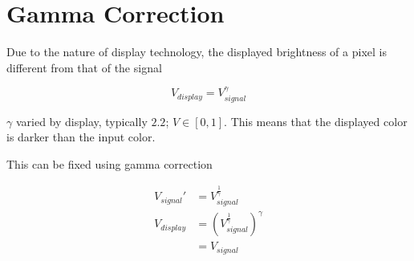 \chapter{Gamma Correction}

  Due to the nature of display technology, the displayed brightness of a pixel
  is different from that of the signal

  \begin{equation}
    V_{display} = V_{signal}^{\gamma}
  \end{equation}

  $ \gamma $ varied by display, typically $ 2.2 $;
  $ V \in \left[ 0, 1 \right] $.  This means that the displayed
  color is darker than the input color.

  This can be fixed using gamma correction

  \begin{align}
    V_{signal}' &= V_{signal}^{\frac{1}{\gamma}} \\
    V_{display}
      &= \left( V_{signal}^{\frac{1}{\gamma}} \right)^{\gamma} \\
      &= V_{signal}
  \end{align}
